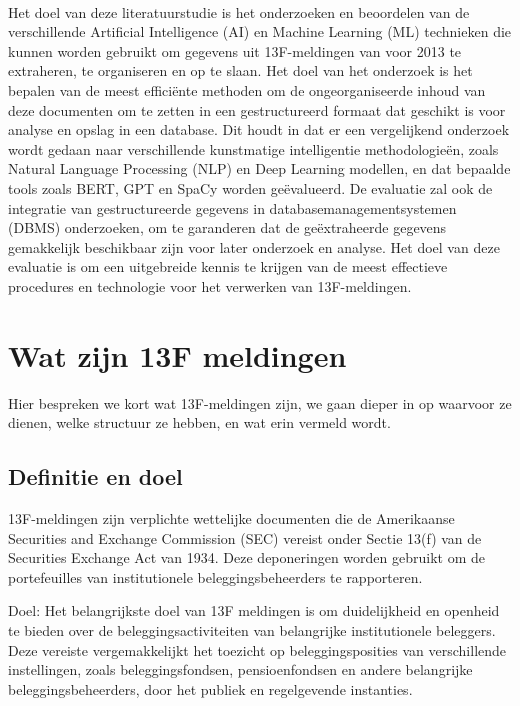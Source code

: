 \\
Het doel van deze literatuurstudie is het onderzoeken en beoordelen van de verschillende Artificial Intelligence (AI) en Machine Learning (ML) technieken die kunnen worden gebruikt om gegevens uit 13F-meldingen van voor 2013 te extraheren, te organiseren en op te slaan. Het doel van het onderzoek is het bepalen van de meest efficiënte methoden om de ongeorganiseerde inhoud van deze documenten om te zetten in een gestructureerd formaat dat geschikt is voor analyse en opslag in een database. Dit houdt in dat er een vergelijkend onderzoek wordt gedaan naar verschillende kunstmatige intelligentie methodologieën, zoals Natural Language Processing (NLP) en Deep Learning modellen, en dat bepaalde tools zoals BERT, GPT en SpaCy worden geëvalueerd. De evaluatie zal ook de integratie van gestructureerde gegevens in databasemanagementsystemen (DBMS) onderzoeken, om te garanderen dat de geëxtraheerde gegevens gemakkelijk beschikbaar zijn voor later onderzoek en analyse. Het doel van deze evaluatie is om een uitgebreide kennis te krijgen van de meest effectieve procedures en technologie voor het verwerken van 13F-meldingen. 

\section{Wat zijn 13F meldingen}

Hier bespreken we kort wat 13F-meldingen zijn, we gaan dieper in op waarvoor ze dienen, welke structuur ze hebben, en wat erin vermeld wordt.
\subsection{Definitie en doel}
13F-meldingen zijn verplichte wettelijke documenten die de Amerikaanse Securities and Exchange Commission (SEC) vereist onder Sectie 13(f) van de Securities Exchange Act van 1934. Deze deponeringen worden gebruikt om de portefeuilles van institutionele beleggingsbeheerders te rapporteren.

Doel: Het belangrijkste doel van 13F meldingen is om duidelijkheid en openheid te bieden over de beleggingsactiviteiten van belangrijke institutionele beleggers. Deze vereiste vergemakkelijkt het toezicht op beleggingsposities van verschillende instellingen, zoals beleggingsfondsen, pensioenfondsen en andere belangrijke beleggingsbeheerders, door het publiek en regelgevende instanties.

